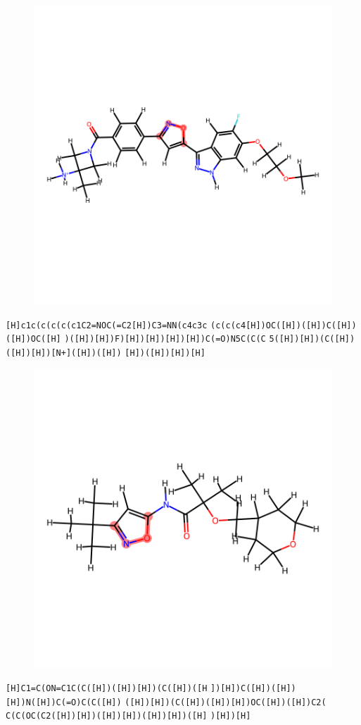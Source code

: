\documentclass{article}
\begin{document}
\begin{figure}[ht]
\centering
    \includegraphics{mol194.png}
\end{figure}
\verb|[H]c1c(c(c(c(c1C2=NOC(=C2[H])C3=NN(c4c3c| \verb|(c(c(c4[H])OC([H])([H])C([H])([H])OC([H]| \verb|)([H])[H])F)[H])[H])[H])[H])C(=O)N5C(C(C| \verb|5([H])[H])(C([H])([H])[H])[N+]([H])([H])| \verb|[H])([H])[H])[H]|

\begin{figure}[ht]
\centering
    \includegraphics{mol195.png}
\end{figure}
\verb|[H]C1=C(ON=C1C(C([H])([H])[H])(C([H])([H| \verb|])[H])C([H])([H])[H])N([H])C(=O)C(C([H])| \verb|([H])[H])(C([H])([H])[H])OC([H])([H])C2(| \verb|C(C(OC(C2([H])[H])([H])[H])([H])[H])([H]| \verb|)[H])[H]|
\end{document}
